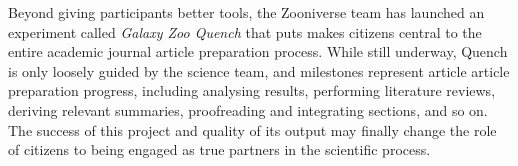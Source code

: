 \documentclass{sigchi}
\begin{document}
Beyond giving participants better tools, the Zooniverse team has launched an experiment called \emph{Galaxy Zoo Quench} that puts makes citizens central to the entire academic journal article preparation process.  While still underway, Quench is only loosely guided by the science team, and milestones represent article article preparation progress, including analysing results, performing literature reviews, deriving relevant summaries, proofreading and integrating sections, and so on.  The success of this project and quality of its output may finally change the role of citizens to being engaged as true partners in the scientific process. 








\end{document}
